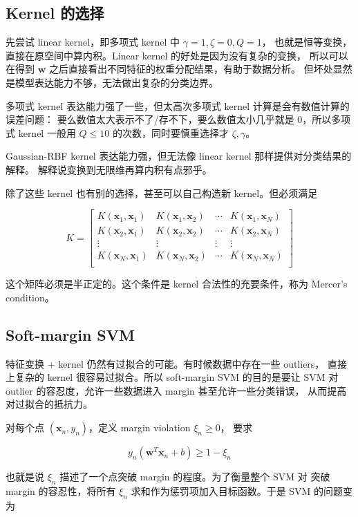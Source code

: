 \documentclass[a4paper]{article}
\begin{document}
\subsection{Kernel 的选择}
先尝试 linear kernel，即多项式 kernel 中 $\gamma = 1, \zeta = 0, Q = 1$，
也就是恒等变换，直接在原空间中算内积。Linear kernel 的好处是因为没有复杂的变换，
所以可以在得到 $\mathbf{w}$ 之后直接看出不同特征的权重分配结果，有助于数据分析。
但坏处显然是模型表达能力不够，无法做出复杂的分类边界。

多项式 kernel 表达能力强了一些，但太高次多项式 kernel 计算是会有数值计算的误差问题：
要么数值太大表示不了/存不下，要么数值太小几乎就是 0，所以多项式 kernel 一般用
$Q \le 10$ 的次数，同时要慎重选择才 $\zeta, \gamma$。

Gaussian-RBF kernel 表达能力强，但无法像 linear kernel 那样提供对分类结果的解释。
解释说变换到无限维再算内积有点邪乎。

除了这些 kernel 也有别的选择，甚至可以自己构造新 kernel。但必须满足

$$K = \begin{bmatrix}
K(\mathbf{x}_1, \mathbf{x}_1) & K(\mathbf{x}_1, \mathbf{x}_2) & \cdots & K(\mathbf{x}_1, \mathbf{x}_N) \\
K(\mathbf{x}_2, \mathbf{x}_1) & K(\mathbf{x}_2, \mathbf{x}_2) & \cdots & K(\mathbf{x}_2, \mathbf{x}_N) \\
\vdots & \vdots & \vdots & \vdots \\
K(\mathbf{x}_N, \mathbf{x}_1) & K(\mathbf{x}_N, \mathbf{x}_2) & \cdots & K(\mathbf{x}_N, \mathbf{x}_N) \\
\end{bmatrix}$$

这个矩阵必须是半正定的。这个条件是 kernel 合法性的充要条件，称为 Mercer's condition。

\subsection{Soft-margin SVM}
特征变换 + kernel 仍然有过拟合的可能。有时候数据中存在一些 outliers，
直接上复杂的 kernel 很容易过拟合。所以 soft-margin SVM 的目的是要让 SVM
对 outlier 的容忍度，允许一些数据进入 margin 甚至允许一些分类错误，
从而提高对过拟合的抵抗力。

对每个点 $(\mathbf{x}_n, y_n)$，定义 margin violation $\xi_n \ge 0$，
要求

$$y_n (\mathbf{w}^T \mathbf{x}_n + b) \ge 1 - \xi_n$$

也就是说 $\xi_n$ 描述了一个点突破 margin 的程度。为了衡量整个 SVM 对
突破 margin 的容忍性，将所有 $\xi_n$ 求和作为惩罚项加入目标函数。于是
SVM 的问题变为
\end{document}
